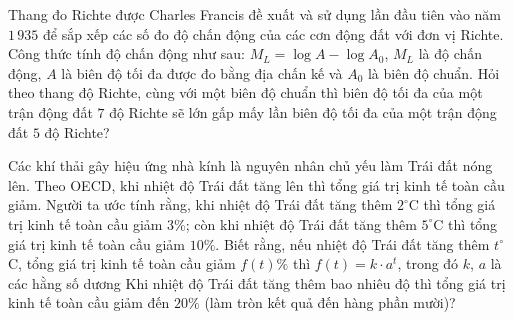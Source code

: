 \begin{ex}%
	Thang đo Richte được Charles Francis đề xuất và sử dụng lần đầu tiên vào năm $1\,935$ để sắp xếp các số đo độ chấn động của các cơn động đất với đơn vị Richte. Công thức tính độ chấn động như sau: $M_L=\log A-\log A_0$, $M_L$ là độ chấn động, $A$ là biên độ tối đa được đo bằng địa chấn kế và $A_0$ là biên độ chuẩn. Hỏi theo thang độ Richte, cùng với một biên độ chuẩn thì  biên độ tối đa của một trận động đất $7$ độ Richte sẽ lớn gấp mấy lần biên độ tối đa của một trận động đất $5$ độ Richte?
\end{ex}

\begin{ex}%
	Các khí thải gây hiệu ứng nhà kính là nguyên nhân chủ yếu làm Trái đất nóng lên. Theo OECD, khi nhiệt độ Trái đất tăng lên thì tổng giá trị kinh tế toàn cầu giảm. Người ta ước tính rằng, khi nhiệt độ Trái đất tăng thêm $2^\circ$C thì tổng giá trị kinh tế toàn cầu  giảm $3\%$; còn khi nhiệt độ Trái đất tăng thêm $5^\circ$C thì tổng giá trị kinh tế toàn cầu giảm $10\%$. Biết rằng, nếu nhiệt độ Trái đất tăng thêm $t^\circ$C, tổng giá trị kinh tế toàn cầu giảm $f(t)\%$ thì $f(t)=k\cdot a^t$, trong đó $k$, $a$ là các hằng số dương Khi nhiệt độ Trái đất tăng thêm bao nhiêu độ thì tổng giá trị kinh tế toàn cầu giảm đến $20\%$ (làm tròn kết quả đến hàng phần mười)?
\end{ex}

